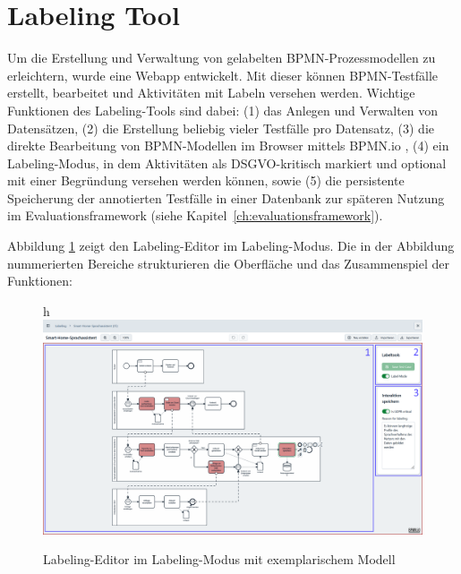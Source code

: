 \section{Labeling Tool}\label{sec:labeling-tool}

Um die Erstellung und Verwaltung von gelabelten \ac{BPMN}-Prozessmodellen zu erleichtern, wurde eine Webapp entwickelt. Mit dieser können \ac{BPMN}-Testfälle erstellt, bearbeitet und Aktivitäten mit Labeln versehen werden. Wichtige Funktionen des Labeling-Tools sind dabei: (1) das Anlegen und Verwalten von Datensätzen, (2) die Erstellung beliebig vieler Testfälle pro Datensatz, (3) die direkte Bearbeitung von \ac{BPMN}-Modellen im Browser mittels BPMN.io \cite{bpmnio}, (4) ein Labeling-Modus, in dem Aktivitäten als \ac{DSGVO}-kritisch markiert und optional mit einer Begründung versehen werden können, sowie (5) die persistente Speicherung der annotierten Testfälle in einer Datenbank zur späteren Nutzung im Evaluationsframework (siehe Kapitel~\ref{ch:evaluationsframework}).

Abbildung \ref{fig:labeling-editor} zeigt den Labeling-Editor im Labeling-Modus. Die in der Abbildung nummerierten Bereiche strukturieren die Oberfläche und das Zusammenspiel der Funktionen:

\begin{figure}{h}
    \centering
    \includegraphics[width=\textwidth]{images/labeling/labeling-editor-annotated}
    \caption{Labeling-Editor im Labeling-Modus mit exemplarischem Modell}
    \label{fig:labeling-editor}
\end{figure}

